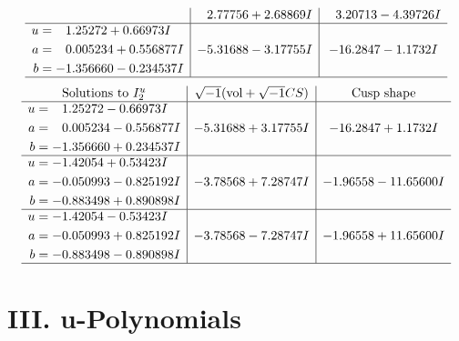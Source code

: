 \documentclass[1p]{elsarticle_modified}
\theoremstyle{definition}
\newcommand{\I}{\sqrt{-1}}
\begin{document}
$$\begin{array}{c|c|c}
 & \phantom{-}2.77756 + 2.68869 I & \phantom{-}3.20713 - 4.39726 I \\ \hline\begin{aligned}
u &= \phantom{-}1.25272 + 0.66973 I \\
a &= \phantom{-}0.005234 + 0.556877 I \\
b &= -1.356660 - 0.234537 I\end{aligned}
 & -5.31688 - 3.17755 I & -16.2847 - 1.1732 I\\
 \hline 
 \end{array}$$\newpage$$\begin{array}{c|c|c}  
\text{Solutions to }I^u_{2}& \I (\text{vol} + \sqrt{-1}CS) & \text{Cusp shape}\\
 \hline 
\begin{aligned}
u &= \phantom{-}1.25272 - 0.66973 I \\
a &= \phantom{-}0.005234 - 0.556877 I \\
b &= -1.356660 + 0.234537 I\end{aligned}
 & -5.31688 + 3.17755 I & -16.2847 + 1.1732 I \\ \hline\begin{aligned}
u &= -1.42054 + 0.53423 I \\
a &= -0.050993 - 0.825192 I \\
b &= -0.883498 + 0.890898 I\end{aligned}
 & -3.78568 + 7.28747 I & -1.96558 - 11.65600 I \\ \hline\begin{aligned}
u &= -1.42054 - 0.53423 I \\
a &= -0.050993 + 0.825192 I \\
b &= -0.883498 - 0.890898 I\end{aligned}
 & -3.78568 - 7.28747 I & -1.96558 + 11.65600 I\\
 \hline 
 \end{array}$$\newpage
\newpage\renewcommand{\arraystretch}{1}
\centering \section*{ III. u-Polynomials}
\end{document}
